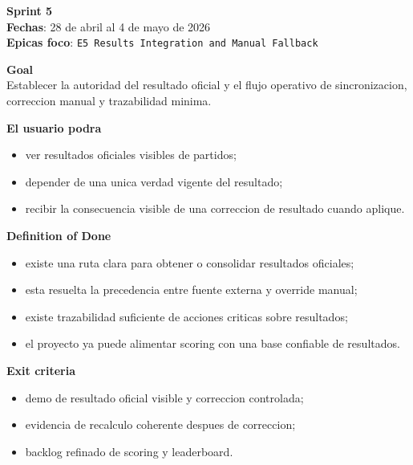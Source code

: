 \begin{docnote}
\textbf{Sprint 5}\\
\textbf{Fechas}: 28 de abril al 4 de mayo de 2026\\
\textbf{Epicas foco}: \texttt{E5 Results Integration and Manual Fallback}

\textbf{Goal}\\
Establecer la autoridad del resultado oficial y el flujo operativo de sincronizacion, correccion manual y trazabilidad minima.

\textbf{El usuario podra}\\
\begin{itemize}
  \item ver resultados oficiales visibles de partidos;
  \item depender de una unica verdad vigente del resultado;
  \item recibir la consecuencia visible de una correccion de resultado cuando aplique.
\end{itemize}

\textbf{Definition of Done}\\
\begin{itemize}
  \item existe una ruta clara para obtener o consolidar resultados oficiales;
  \item esta resuelta la precedencia entre fuente externa y override manual;
  \item existe trazabilidad suficiente de acciones criticas sobre resultados;
  \item el proyecto ya puede alimentar scoring con una base confiable de resultados.
\end{itemize}

\textbf{Exit criteria}\\
\begin{itemize}
  \item demo de resultado oficial visible y correccion controlada;
  \item evidencia de recalculo coherente despues de correccion;
  \item backlog refinado de scoring y leaderboard.
\end{itemize}
\end{docnote}


